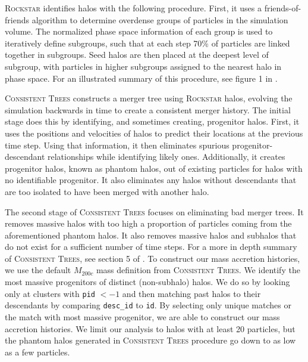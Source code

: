 \textsc{Rockstar} identifies halos with the following procedure. First, it uses a friends-of-friends algorithm \cite{FoF} to determine overdense groups of particles in the simulation volume. The normalized phase space information of each group is used to iteratively define subgroups, such that at each step 70\% of particles are linked together in subgroups. Seed halos are then placed at the deepest level of subgroup, with particles in higher subgroups assigned to the nearest halo in phase space. For an illustrated summary of this procedure, see figure 1 in \cite{Rockstar}. 

\textsc{Consistent Trees} constructs a merger tree using \textsc{Rockstar} halos, evolving the simulation backwards in time to create a consistent merger history. The initial stage does this by identifying, and sometimes creating, progenitor halos. First, it uses the positions and velocities of halos to predict their locations at the previous time step. Using that information, it then eliminates spurious progenitor-descendant relationships while identifying likely ones. Additionally, it creates progenitor halos, known as phantom halos, out of existing particles for halos with no identifiable progenitor. It also eliminates any halos without descendants that are too isolated to have been merged with another halo. 

The second stage of \textsc{Consistent Trees} focuses on eliminating bad merger trees. It removes massive halos with too high a proportion of particles coming from the aforementioned phantom halos. It also removes massive halos and subhalos that do not exist for a sufficient number of time steps. For a more in depth summary of \textsc{Consistent Trees}, see section 5 of \cite{Consistent_trees}. To construct our mass accretion histories, we use the default $M_{200c}$ mass definition from \textsc{Consistent Trees}. We identify the most massive progenitors of distinct (non-subhalo) halos. We do so by looking only at clusters with \texttt{pid} $< -1$ and then matching past halos to their descendants by comparing \texttt{desc\_id} to \texttt{id}. By selecting only unique matches or the match with most massive progenitor, we are able to construct our mass accretion histories. We limit our analysis to halos with at least 20 particles, but the phantom halos generated in \textsc{Consistent Trees} procedure go down to as low as a few particles.


